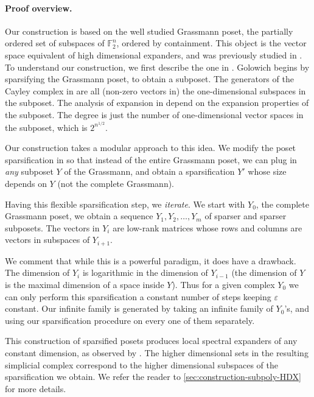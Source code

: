 \documentclass[10pt,a4paper]{article}
\newcommand{\prettyref}[1]{\cref{#1}}
\theoremstyle{definition}
\theoremstyle{remark}
\newcommand{\F}{\mathbb{F}}
\numberwithin{equation}{section}
\let\origparagraph\paragraph
\renewcommand{\paragraph}[1]{\origparagraph{#1.}}
\let\pref=\prettyref
\def\Y{Y}
\begin{document}
\paragraph{Proof overview} Our construction is based on the well studied Grassmann poset, the partially ordered set of subspaces of \(\F_2^n\), ordered by containment. This object is the vector space equivalent of high dimensional expanders, and was previously studied in \cite{DiksteinDFH2018,kaufmanT2021garland,GaitondeHKLZ2022,Golowich2023}. To understand our construction, we first describe the one in \cite{Golowich2023}. Golowich begins by sparsifying the Grassmann poset, to obtain a subposet. The generators of the Cayley complex in \cite{Golowich2023} are all (non-zero vectors in) the one-dimensional subspaces in the subposet. The analysis of expansion in \cite{Golowich2023} depend on the expansion properties of the subposet. The degree is just the number of one-dimensional vector spaces in the subposet, which is \(2^{n^{1/2}}\).

Our construction takes a modular approach to this idea. We modify the poset sparsification in \cite{Golowich2023} so that instead of the entire Grassmann poset, we can plug in \emph{any} subposet \(\Y\) of the Grassmann, and obtain a sparsification \(\Y'\) whose size depends on \(\Y\) (not the complete Grassmann).

Having this flexible sparsification step, we \emph{iterate}. We start with \(Y_0\), the complete Grassmann poset, we obtain a sequence \(\Y_1,\Y_2,\dots,\Y_m\) of sparser and sparser subposets. The vectors in \(\Y_i\) are low-rank matrices whose rows and columns are vectors in subspaces of \(\Y_{i+1}\).

We comment that while this is a powerful paradigm, it does have a drawback. The dimension of \(\Y_{i}\) is logarithmic in the dimension of \(\Y_{i-1}\) (the dimension of \(Y\) is the maximal dimension of a space inside \(\Y\)). Thus for a given complex \(\Y_0\) we can only perform this sparsification a constant number of steps keeping \(\varepsilon\) constant. Our infinite family is generated by taking an infinite family of \(\Y_0\)'s, and using our sparsification procedure on every one of them separately.

This construction of sparsified posets produces local spectral expanders of any constant dimension, as observed by \cite{Golowich2023}. The higher dimensional sets in the resulting simplicial complex correspond to the higher dimensional subspaces of the sparsification we obtain. We refer the reader to \pref{sec:construction-subpoly-HDX} for more details.
\end{document}

